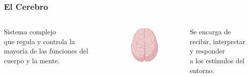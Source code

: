 \documentclass[
11pt, %
%
aspectratio=169, %
]{beamer}
\begin{document}
      \begin{frame}
     	\frametitle{El Cerebro}
     	
     	\begin{columns}[c] %
     		\begin{column}{0.3\textwidth} %
     			\centering
     		Sistema complejo\\
     		que regula y controla la mayor\'ia
     		de las funciones del cuerpo y la mente.
     			
     			
     		\end{column}
     		
     		\begin{column}{0.3\textwidth}
       		\begin{figure}
     			\centering
     			\includegraphics[scale=0.7]{Graphics/brain_pink}
     		\end{figure}
     		\end{column}
     		
     		\begin{column}{0.3\textwidth} %
     			\centering
     			Se encarga de recibir, interpretar y responder \\
     			a los est\'imulos del entorno.     			
     			
     		\end{column}
     	\end{columns} 	
        	
     	
     \end{frame}
 
\end{document}
